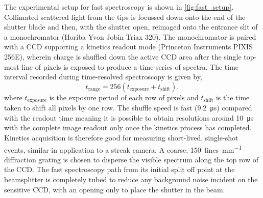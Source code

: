 \documentclass[12pt, a4paper, twoside]{book}
\begin{document}
The experimental setup for fast spectroscopy is shown in \autoref{fig:fast_setup}. Collimated scattered light from the tips is focussed down onto the end of the shutter blade and then, with the shutter open, reimaged onto the entrance slit of a monochromator (Horiba Yvon Jobin Triax 320). The monochromator is paired with a CCD supporting a kinetics readout mode (Princeton Instruments PIXIS 256E), wherein charge is shuffled down the active CCD area after the single top-most line of pixels is exposed to produce a time-series of spectra. The time interval recorded during time-resolved spectroscopy is given by,
\begin{equation} t_{\mathrm{range}} = 256 (t_{\mathrm{exposure}} + t_{\mathrm{shift}}), \end{equation}
where $t_{\mathrm{exposure}}$ is the exposure period of each row of pixels and $t_{\mathrm{shift}}$ is the time taken to shift all pixels by one row. The shuffle speed is fast (\SI{9.2}{\micro\second}) compared with the readout time meaning it is possible to obtain resolutions around \SI{10}{\micro\second} with the complete image readout only once the kinetics process has completed. Kinetics acquisition is therefore good for measuring short-lived, single-shot events, similar in application to a streak camera. A coarse, \SI{150}{lines.mm^{-1}} diffraction grating is chosen to disperse the visible spectrum along the top row of the CCD. The fast spectroscopy path from its initial split off point at the beamsplitter is completely tubed to reduce any background noise incident on the sensitive CCD, with an opening only to place the shutter in the beam.
\end{document}
